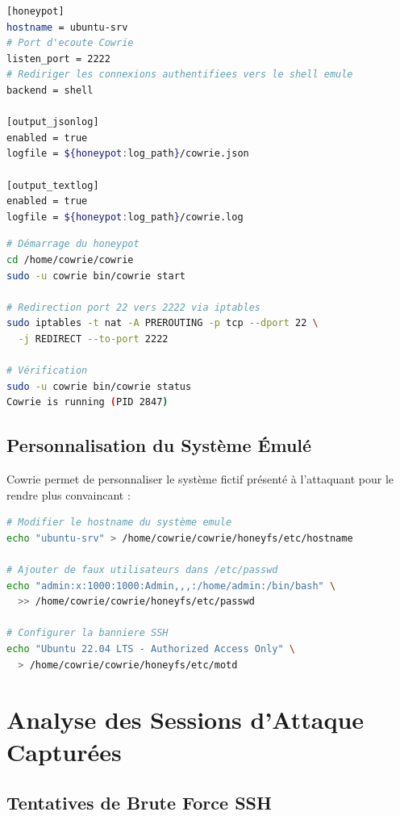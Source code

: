 \documentclass[12pt,a4paper,openany]{report}
\begin{document}
\begin{lstlisting}[language=bash, caption={Configuration principale de Cowrie (cowrie.cfg)}]
[honeypot]
hostname = ubuntu-srv
# Port d'ecoute Cowrie
listen_port = 2222
# Rediriger les connexions authentifiees vers le shell emule
backend = shell

[output_jsonlog]
enabled = true
logfile = ${honeypot:log_path}/cowrie.json

[output_textlog]
enabled = true
logfile = ${honeypot:log_path}/cowrie.log
\end{lstlisting}

\begin{lstlisting}[language=bash, caption={Démarrage de Cowrie et redirection du port 22}]
# Démarrage du honeypot
cd /home/cowrie/cowrie
sudo -u cowrie bin/cowrie start

# Redirection port 22 vers 2222 via iptables
sudo iptables -t nat -A PREROUTING -p tcp --dport 22 \
  -j REDIRECT --to-port 2222

# Vérification
sudo -u cowrie bin/cowrie status
Cowrie is running (PID 2847)
\end{lstlisting}

\subsection{Personnalisation du Système Émulé}

Cowrie permet de personnaliser le système fictif présenté à l'attaquant pour le rendre plus
convaincant :
\begin{lstlisting}[language=bash, caption={Personnalisation de la bannière SSH et du système Cowrie}]
# Modifier le hostname du système emule
echo "ubuntu-srv" > /home/cowrie/cowrie/honeyfs/etc/hostname

# Ajouter de faux utilisateurs dans /etc/passwd
echo "admin:x:1000:1000:Admin,,,:/home/admin:/bin/bash" \
  >> /home/cowrie/cowrie/honeyfs/etc/passwd

# Configurer la banniere SSH
echo "Ubuntu 22.04 LTS - Authorized Access Only" \
  > /home/cowrie/cowrie/honeyfs/etc/motd
\end{lstlisting}

\section{Analyse des Sessions d'Attaque Capturées}

\subsection{Tentatives de Brute Force SSH}
\end{document}
